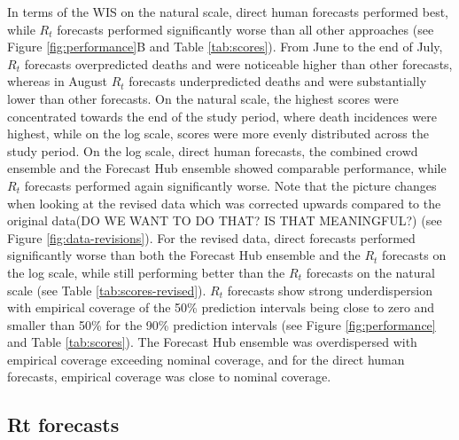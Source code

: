 \documentclass[10pt,a4paper,twocolumn]{article}
\begin{document}
In terms of the WIS on the natural scale, direct human forecasts performed best, while $R_t$ forecasts performed significantly worse than all other approaches (see Figure \ref{fig:performance}B and Table \ref{tab:scores}). From June to the end of July, $R_t$ forecasts overpredicted deaths and were noticeable higher than other forecasts, whereas in August $R_t$ forecasts underpredicted deaths and were substantially lower than other forecasts. On the natural scale, the highest scores were concentrated towards the end of the study period, where death incidences were highest, while on the log scale, scores were more evenly distributed across the study period. On the log scale, direct human forecasts, the combined crowd ensemble and the Forecast Hub ensemble showed comparable performance, while $R_t$ forecasts performed again significantly worse. Note that the picture changes when looking at the revised data which was corrected upwards compared to the original data(DO WE WANT TO DO THAT? IS THAT MEANINGFUL?) (see Figure \ref{fig:data-revisions}). For the revised data, direct forecasts performed significantly worse than both the Forecast Hub ensemble and the $R_t$ forecasts on the log scale, while still performing better than the $R_t$ forecasts on the natural scale (see Table \ref{tab:scores-revised}). 
$R_t$ forecasts show strong underdispersion with empirical coverage of the 50\% prediction intervals being close to zero and smaller than 50\% for the 90\% prediction intervals (see Figure \ref{fig:performance} and Table \ref{tab:scores}). The Forecast Hub ensemble was overdispersed with empirical coverage exceeding nominal coverage, and for the direct human forecasts, empirical coverage was close to nominal coverage. 




\subsection*{Rt forecasts}
\end{document}
